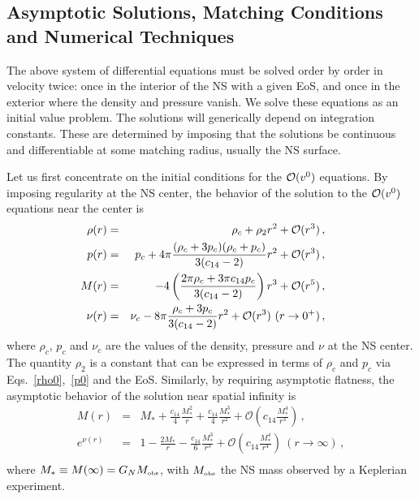 \documentclass[prd,aps,twocolumn,nofootinbib,showpacs,superscriptaddress]{revtex4-1}
\newcommand\ba{\begin{eqnarray}}
\newcommand\ea{\end{eqnarray}}
\newcommand{\nn}{\nonumber}
\newcommand{\obs}{{\mbox{\tiny obs}}}
\begin{document}
\subsection{Asymptotic Solutions, Matching Conditions and Numerical Techniques}
\label{subsec:AS}

The above system of differential equations must be solved order by
order in velocity twice: once in the interior of the NS with a given
EoS, and once in the exterior where the density and pressure
vanish. We solve these equations as an initial value problem. The
solutions will generically depend on integration
 constants. These are determined by 
imposing that the solutions be  continuous and differentiable at some
matching radius, usually
the NS surface.

Let us first concentrate on the initial conditions for the
${\cal{O}}(v^{0})$ equations. By imposing regularity at the NS center,
the  behavior of the solution to the ${\cal{O}}(v^{0})$
equations near the center is 
%
\ba
\label{rho0}
\hspace{-.5cm}\rho(r) &=& \rho_c + \rho_2 r^2 + \mathcal{O}(r^3)\,, \\
\label{p0}
\hspace{-.5cm}p(r) &=& p_c + 4 \pi \frac{(\rho_c +3 p_c) (\rho_c + p_c) }{3
  (c_{14}-2)}r^2 + \mathcal{O}(r^3)\,, \\
\label{M0}
\hspace{-.5cm}M(r) &=& - 4 \left(\frac{2 \pi \rho_c + 3 \pi c_{14} p_c}{3(c_{14}-2)} \right)r^3 +
\mathcal{O}(r^5)\,, \\
\label{nu0}
\hspace{-.5cm}\nu(r) &=& \nu_c  -8 \pi \frac{\rho_c+3 p_c}{3 (c_{14}-2)} r^2 +
\mathcal{O}(r^3) \ (r\to 0^+)\,, \ea
% 
where $\rho_c$, $p_c$ and $\nu_{c}$ are the values of the density,
pressure and $\nu$ at the NS center. The quantity $\rho_2$ is a
constant that can be expressed in terms of $\rho_c$ and $p_c$ via
Eqs.~\eqref{rho0},~\eqref{p0} and the EoS. Similarly, by requiring
asymptotic flatness, the asymptotic behavior of the solution near
spatial infinity is 
%
\ba
\label{M-inf}
M(r) &=& M_* + \frac{c_{14}}{4} \frac{M_*^2}{r} + \frac{c_{14}}{4}
\frac{M_*^3}{r^2} + \mathcal{O} \left( c_{14} \frac{M_*^4}{r^3}
\right)\,, \\
\label{nu-inf}
e^{\nu (r)} &=& 1 -\frac{2 M_*}{r}-\frac{c_{14}}{6} \frac{M_*^3}{r^3}
+ \mathcal{O} \left( c_{14} \frac{M_*^4}{r^4} \right) \ (r \to
\infty)\,, \nn \\ \ea
%
where $M_* \equiv M(\infty) = G_N M_\obs$, with $M_\obs$ the NS mass observed by a Keplerian experiment.
\end{document}
